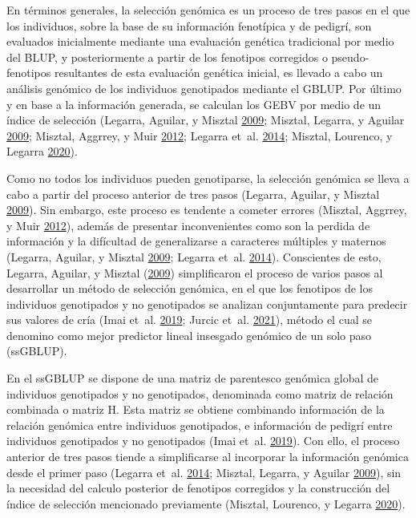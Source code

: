 \documentclass[11pt,spanish,a4paper,oneside,]{book} %
\begin{document}
En términos generales, la selección genómica es un proceso de tres pasos en el que los individuos, sobre la base de su información fenotípica y de pedigrí, son evaluados inicialmente mediante una evaluación genética tradicional por medio del BLUP, y posteriormente a partir de los fenotipos corregidos o pseudo-fenotipos resultantes de esta evaluación genética inicial, es llevado a cabo un análisis genómico de los individuos genotipados mediante el GBLUP. Por último y en base a la información generada, se calculan los GEBV por medio de un índice de selección (Legarra, Aguilar, y Misztal \protect\hyperlink{ref-cite:17}{2009}; Misztal, Legarra, y Aguilar \protect\hyperlink{ref-cite:16}{2009}; Misztal, Aggrrey, y Muir \protect\hyperlink{ref-cite:14}{2012}; Legarra et~al. \protect\hyperlink{ref-cite:15}{2014}; Misztal, Lourenco, y Legarra \protect\hyperlink{ref-cite:18}{2020}).

Como no todos los individuos pueden genotiparse, la selección genómica se lleva a cabo a partir del proceso anterior de tres pasos (Legarra, Aguilar, y Misztal \protect\hyperlink{ref-cite:17}{2009}). Sin embargo, este proceso es tendente a cometer errores (Misztal, Aggrrey, y Muir \protect\hyperlink{ref-cite:14}{2012}), además de presentar inconvenientes como son la perdida de información y la difícultad de generalizarse a caracteres múltiples y maternos (Legarra, Aguilar, y Misztal \protect\hyperlink{ref-cite:17}{2009}; Legarra et~al. \protect\hyperlink{ref-cite:15}{2014}). Conscientes de esto, Legarra, Aguilar, y Misztal (\protect\hyperlink{ref-cite:17}{2009}) simplificaron el proceso de varios pasos al desarrollar un método de selección genómica, en el que los fenotipos de los individuos genotipados y no genotipados se analizan conjuntamente para predecir sus valores de cría (Imai et~al. \protect\hyperlink{ref-cite:20}{2019}; Jurcic et~al. \protect\hyperlink{ref-cite:11}{2021}), método el cual se denomino como mejor predictor lineal insesgado genómico de un solo paso (ssGBLUP).

En el ssGBLUP se dispone de una matriz de parentesco genómica global de individuos genotipados y no genotipados, denominada como matriz de relación combinada o matriz H. Esta matriz se obtiene combinando información de la relación genómica entre individuos genotipados, e información de pedigrí entre individuos genotipados y no genotipados (Imai et~al. \protect\hyperlink{ref-cite:20}{2019}). Con ello, el proceso anterior de tres pasos tiende a simplificarse al incorporar la información genómica desde el primer paso (Legarra et~al. \protect\hyperlink{ref-cite:15}{2014}; Misztal, Legarra, y Aguilar \protect\hyperlink{ref-cite:16}{2009}), sin la necesidad del calculo posterior de fenotipos corregidos y la construcción del índice de selección mencionado previamente (Misztal, Lourenco, y Legarra \protect\hyperlink{ref-cite:18}{2020}).
\end{document}

